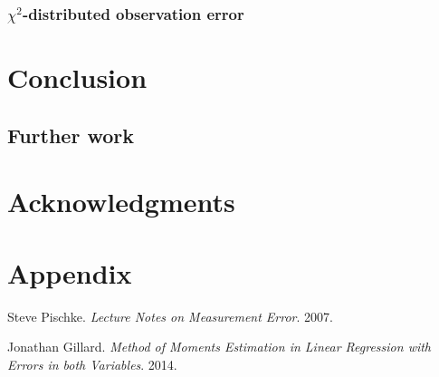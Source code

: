 \documentclass{article}
\begin{document}
\subsubsection{$\chi^2$-distributed observation error}

\section{Conclusion}

\subsection{Further work}

\section{Acknowledgments}

\section{Appendix}

\begin{thebibliography}{9}

    Steve Pischke.
    \textit{Lecture Notes on Measurement Error}.
    2007.

    Jonathan Gillard.
    \textit{Method of Moments Estimation in Linear Regression with Errors in both Variables}.
    2014.

\end{thebibliography}
\end{document}
